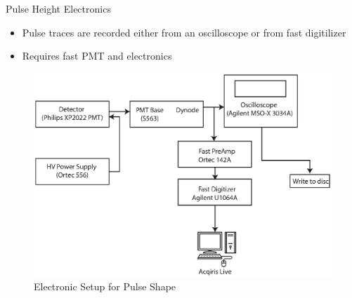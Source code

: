 \begin{frame}{Pulse Height Electronics}
	\begin{itemize}
		\small
		\item Pulse traces are recorded either from an oscilloscope or from fast digitilizer
		\item Requires fast PMT and electronics
	\end{itemize}
	\begin{figure}
		\centering
		\includegraphics[height=0.45\textheight]{images/ElectronicsPSD.eps}
		\caption{Electronic Setup for Pulse Shape}
		\label{fig:ElectronicsPSD}
	\end{figure}
\end{frame}

